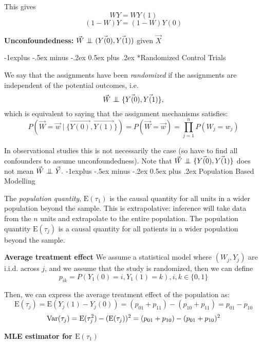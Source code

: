\documentclass[10pt,landscape]{article}
\makeatletter
\newcommand\independent{\protect\mathpalette{\protect\independenT}{\perp}}
\def\independenT#1#2{\mathrel{\setbox0\hbox{$#1#2$}%
    \copy0\kern-\wd0\mkern4mu\box0}}
\renewcommand{\subsection}{\@startsection{subsection}{2}{0mm}%
                                {-1explus -.5ex minus -.2ex}%
                                {0.5ex plus .2ex}%
                                {\normalfont\normalsize\bfseries}}
\newcommand{\E}{\text{E}}
\makeatother
\begin{document}
\begin{multicols*}{3}
This gives $$WY = WY(1)$$ $$(1-W)Y = (1-W)Y(0)$$

\textbf{Unconfoundedness:} $\vec W\independent (\vec{Y(0)},\vec{Y(1)})$ given $\vec{X}$

\subsection*{Randomized Control Trials}

We say that the assignments have been \textit{randomized} if the assignments are independent of the potential outcomes, i.e.
$$\vec W \independent \{\vec{Y(0)}, \vec{Y(1)}\},$$ which is equivalent to saying that the assignment mechanisms satisfies: $$P(\vec W = \vec w \mid \{\vec{Y(0)}, \vec{Y(1)}\})= P(\vec W=\vec w) = \prod_{j=1}^{n}P(W_j=w_j)$$

In observational studies this is not necessarily the case (so have to find all confounders to assume unconfoundedness). Note that $\vec W \independent \{\vec{Y(0)}, \vec{Y(1)}\}$ does not mean $\vec W\independent \vec Y.$
\subsection{Population Based Modelling}

The \textit{population quantity}, $\E(\tau_1)$ is the causal quantity for all units in a wider population beyond the sample. This is extrapolative: inference will take data from the $n$ units and extrapolate to the entire population. The population quantity $\E(\tau_j)$ is a causal quantity for all patients in a wider population beyond the sample. 

\textbf{Average treatment effect}
    We assume a statistical model where $(W_j, Y_j)$ are i.i.d. across $j$, and we assume that the study is randomized, then we can define $$p_{ik} = P(Y_1(0) = i, Y_1(1) = k), i, k \in \{0, 1\}$$

    Then, we can express the average treatment effect of the population as:
    $$\E(\tau_j) = \E(Y_j(1)-Y_j(0)) = (p_{01}+p_{11})-(p_{10}+p_{11}) =p_{01} -p_{10} $$
    $$\Var(\tau_j) = \E(\tau_j^2) - (\E(\tau_j))^2 = (p_{01} + p_{10}) - (p_{01}+p_{10})^2$$


\textbf{MLE estimator for $\E(\tau_1)$ }



\end{multicols*}
\end{document}
